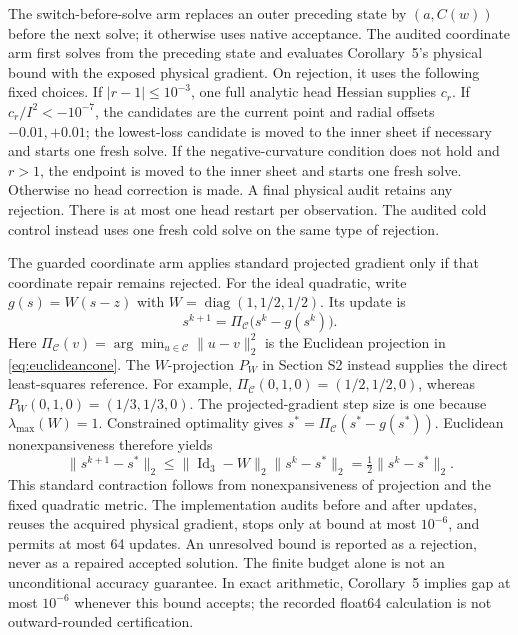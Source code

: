 The switch-before-solve arm replaces an outer preceding state by $(a,C(w))$ before the next solve; it otherwise uses native acceptance. The audited coordinate arm first solves from the preceding state and evaluates Corollary~5's physical bound with the exposed physical gradient. On rejection, it uses the following fixed choices. If $|r-1|\le10^{-3}$, one full analytic head Hessian supplies $c_r$. If $c_r/I^2<-10^{-7}$, the candidates are the current point and radial offsets $-0.01,+0.01$; the lowest-loss candidate is moved to the inner sheet if necessary and starts one fresh solve. If the negative-curvature condition does not hold and $r>1$, the endpoint is moved to the inner sheet and starts one fresh solve. Otherwise no head correction is made. A final physical audit retains any rejection. There is at most one head restart per observation. The audited cold control instead uses one fresh cold solve on the same type of rejection.

The guarded coordinate arm applies standard projected gradient only if that coordinate repair remains rejected. For the ideal quadratic, write $g(s)=W(s-z)$ with $W=\operatorname{diag}(1,1/2,1/2)$. Its update is
\begin{equation}
 s^{k+1}=\Pi_{\mathcal C}\bigl(s^k-g(s^k)\bigr).
 \label{eq:physicalpg}
\end{equation}
Here $\Pi_{\mathcal C}(v)=\arg\min_{u\in\mathcal C}\|u-v\|_2^2$ is the Euclidean projection in \eqref{eq:euclideancone}. The $W$-projection $P_W$ in Section S2 instead supplies the direct least-squares reference. For example, $\Pi_{\mathcal C}(0,1,0)=(1/2,1/2,0)$, whereas $P_W(0,1,0)=(1/3,1/3,0)$. The projected-gradient step size is one because $\lambda_{\max}(W)=1$. Constrained optimality gives $s^*=\Pi_{\mathcal C}(s^*-g(s^*))$. Euclidean nonexpansiveness therefore yields
\begin{equation}
 \|s^{k+1}-s^*\|_2\le\|\operatorname{Id}_3-W\|_2\|s^k-s^*\|_2
 =\tfrac12\|s^k-s^*\|_2.
 \label{eq:pgcontraction}
\end{equation}
This standard contraction follows from nonexpansiveness of projection and the fixed quadratic metric. The implementation audits before and after updates, reuses the acquired physical gradient, stops only at bound at most $10^{-6}$, and permits at most 64 updates. An unresolved bound is reported as a rejection, never as a repaired accepted solution. The finite budget alone is not an unconditional accuracy guarantee. In exact arithmetic, Corollary~5 implies gap at most $10^{-6}$ whenever this bound accepts; the recorded float64 calculation is not outward-rounded certification.

